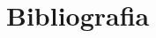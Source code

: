 \documentclass[10pt,twoside,openany,x11names,svgnames,italian,a5paper,dvipsnames,table]{memoir}
\newcommand\chapterillustration{}
\newcommand{\backgroundrectanglecolor}{LightGreen!80!white}
\begin{document}
\chapter{Bibliografia}
\renewcommand\chapterillustration{}
\renewcommand*{\bibname}{}
\begingroup
\renewcommand{\addcontentsline}[3]{}%
\renewcommand{\section}[2]{}%
\begin{thebibliography}{9}
\footnotesize




\end{thebibliography}
\end{document}

